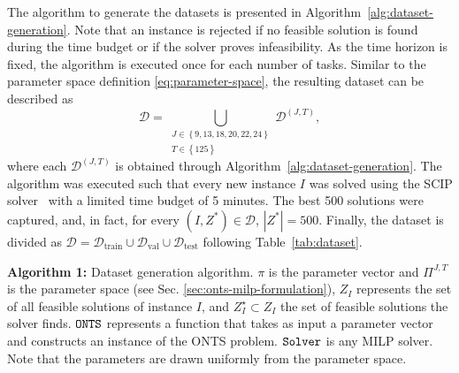 The algorithm to generate the datasets is presented in Algorithm~\ref{alg:dataset-generation}.
Note that an instance is rejected if no feasible solution is found during the time budget or if the solver proves infeasibility.
As the time horizon is fixed, the algorithm is executed once for each number of tasks.
Similar to the parameter space definition \eqref{eq:parameter-space}, the resulting dataset can be described as
\begin{equation}\label{eq:dataset}
    \mathcal{D} = \bigcup_{\substack{J \in \left\{ 9,13,18,20,22,24 \right\} \\ T \in \left\{ 125 \right\} }}  \mathcal{D}^{(J,T)}
,\end{equation}
where each $\mathcal{D}^{(J,T)}$ is obtained through Algorithm~\ref{alg:dataset-generation}.
The algorithm was executed such that every new instance $I$ was solved using the SCIP solver~\cite{bestuzhevaSCIPOptimizationSuite2021} with a limited time budget of 5 minutes.
The best 500 solutions were captured, and, in fact, for every $(I,Z^{*}) \in \mathcal{D}$, $|Z^{*}| = 500$.
Finally, the dataset is divided as $\mathcal{D} = \mathcal{D}_\textrm{train} \cup \mathcal{D}_{\textrm{val}} \cup \mathcal{D}_\textrm{test}$ following Table~\ref{tab:dataset}.

\begin{algorithm}[h]
    \NoCaptionOfAlgo
    \SetAlgoLined
    
    \caption{\textbf{Algorithm 1:} Dataset generation algorithm. $\pi$ is the parameter vector and $\Pi^{J,T}$ is the parameter space (see Sec. \ref{sec:onts-milp-formulation}), $Z_I$ represents the set of all feasible solutions of instance $I$, and $Z_I^\star \subset Z_I$ the set of feasible solutions the solver finds.
    ${\tt ONTS}$ represents a function that takes as input a parameter vector and constructs an instance of the ONTS problem.
    ${\tt Solver}$ is any MILP solver.
    Note that the parameters are drawn uniformly from the parameter space.
    }\label{alg:dataset-generation}
\end{algorithm}

